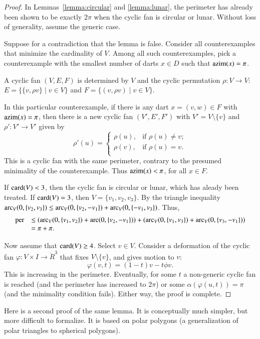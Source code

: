 \begin{proof} In Lemmas~\ref{lemma:circular} and \ref{lemma:lunar}, the perimeter has already been shown to be exactly $2\pi$ when the cyclic fan is circular or lunar.  Without loss of generality, assume the generic case.

Suppose for a contradiction that the lemma is false.  Consider all counterexamples
that minimize the cardinality of $V$.  Among all such counterexamples, pick a counterexample with the smallest number of darts $x\in D$ such that ${\operatorname{azim}}(x) = \pi$.

A cyclic fan $(V,E,F)$ is determined by $V$ and the cyclic permutation $\rho:V\to V$:  $E=\{\{v,\rho v\}\mid v\in V\}$ and $F = \{(v,\rho v)\mid v\in V\}$.

In this particular counterexample, if there is any dart $x=(v,w)\in F$ with ${\operatorname{azim}}(x)=\pi$, then there is a new cyclic fan $(V',E',F')$ with $V' = V\setminus\{v\}$ and $\rho':V'\to V'$ given by 
$$
\rho'(u) = \begin{cases}
\rho(u), & \text{if } \rho(u)\ne v;\\
\rho(v), & \text{if }\rho(u) = v.\\
\end{cases}
$$
This is a cyclic fan with the same perimeter, contrary to the presumed minimality of the counterexample.  Thus ${\operatorname{azim}}(x) <\pi$, for all $x\in F$.

If ${\operatorname{card}}(V) <3$, then the cyclic fan is circular or lunar, which has aleady been treated.  If ${\operatorname{card}}(V)=3$, then $V=\{v_1,v_2,v_3\}$.  By the triangle inequality $\operatorname{arc}_V(0,\{v_2,v_3\}) \le \operatorname{arc}_V(0,\{v_2,-v_1\})+\operatorname{arc}_V(0,\{-v_1,v_3\})$.  Thus,
$$
\begin{array}{rll}
{\operatorname{per}} &\le(\operatorname{arc}_V(0,\{v_1,v_2\})+\operatorname{arc}(0,\{v_2,-v_1\}))+(\operatorname{arc}_V(0,\{v_1,v_3\})+\operatorname{arc}_V(0,\{v_3,-v_1\})) \\
   &= \pi+\pi.
\end{array}
$$

Now assume that ${\operatorname{card}}(V)\ge 4$.  Select $v\in V$.  Consider a deformation of the cyclic fan $\varphi:V\times I \to \ring{R}^3$ that fixes $V\setminus\{v\}$, and gives motion to $v$:
$$
\varphi(v,t) = (1-t) v - t \phi v.
$$
This is increasing in the perimeter.  Eventually, for some $t$ a non-generic cyclic fan is reached (and the perimeter has increased to $2\pi$) or some $\alpha(\varphi(u,t))=\pi$ (and the minimality condition fails).  Either way, the proof is complete. 
\end{proof}

Here is a second proof of the same lemma.  It is conceptually much simpler, but more difficult to formalize.  It is based on polar polygons (a generalization of polar triangles to spherical polygons).

